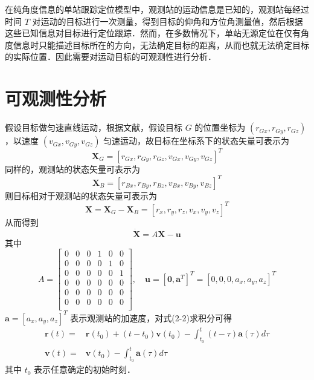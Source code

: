 在纯角度信息的单站跟踪定位模型中，观测站的运动信息是已知的，观测站每经过时间 $T$ 对运动的目标进行一次测量，得到目标的仰角和方位角测量值，然后根据这些已知信息对目标进行定位跟踪．然而，在多数情况下，单站无源定位在仅有角度信息时只能描述目标所在的方向，无法确定目标的距离，从而也就无法确定目标的实际位置．因此需要对运动目标的可观测性进行分析．
\section{可观测性分析}
假设目标做匀速直线运动，根据文献\cite{4104040}，假设目标 $G$ 的位置坐标为 $(r_{Gx},r_{Gy},r_{Gz})$，以速度 $(v_{Gx},v_{Gy},v_{Gz})$ 匀速运动，故目标在坐标系下的状态矢量可表示为 
\begin{equation*}
	\bm{X}_{G} = [r_{Gx},r_{Gy},r_{Gz},v_{Gx},v_{Gy},v_{Gz}]^T
\end{equation*} 
同样的，观测站的状态矢量可表示为 
\begin{equation*}
	\bm{X}_B = [r_{Bx},r_{By},r_{Bz},v_{Bx},v_{By},v_{Bz}]^T
\end{equation*}
则目标相对于观测站的状态矢量可表示为
\begin{equation}
	\bm{X} = \bm{X}_G - \bm{X}_B = [r_x,r_y,r_z,v_x,v_y,v_z]^T
\end{equation}
从而得到
\begin{equation}
	\dot{\bm{X}} = A\bm{X} - \bm{u} 
\end{equation}
其中
\begin{equation*}
		A = \left[ \begin{array}{ccc|ccc}
			0 & 0 & 0 & 1 & 0 & 0 \\
			0 & 0 & 0 & 0 & 1 & 0 \\
			0 & 0 & 0 & 0 & 0 & 1 \\ \hline 
			0 & 0 & 0 & 0 & 0 & 0 \\
			0 & 0 & 0 & 0 & 0 & 0 \\
			0 & 0 & 0 & 0 & 0 & 0 \\
		\end{array} \right ], \quad
	\bm{u} = [\bm{0}, \bm{a}^T ]^T = [0, 0, 0, a_x, a_y, a_z]^T 
\end{equation*}
$\bm{a} = [a_x,a_y,a_z]^T$ 表示观测站的加速度，对式(2-2)求积分可得
\begin{equation}
	\begin{split}
		\bm{r}(t) =& \bm{r}(t_0) + (t-t_0)\bm{v}(t_0) - \int_{t_0}^{t}(t-\tau)\bm{a}(\tau)d\tau \\
		\bm{v}(t) =& \bm{v}(t_0) - \int_{t_0}^{t}\bm{a}(\tau)d\tau
	\end{split}	
\end{equation}
其中 $t_0$ 表示任意确定的初始时刻．

